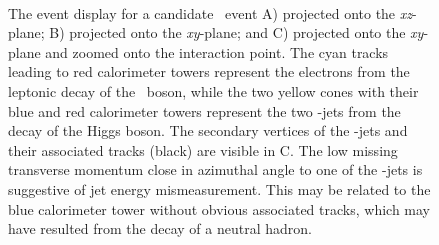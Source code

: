 \begin{figure}[htbp]
  \centering
  \mbox{
  }
  \mbox{
  }
  \caption[Event Display for \ZeeHbb\ Candidate]{The event display for a candidate \ZeeHbb\ event A) projected onto the \textit{xz}-plane; B) projected onto the \textit{xy}-plane; and C) projected onto the \textit{xy}-plane and zoomed onto the interaction point. The cyan tracks leading to red calorimeter towers represent the electrons from the leptonic decay of the \bosZ\ boson, while the two yellow cones with their blue and red calorimeter towers represent the two \qrkb-jets from the decay of the Higgs boson. The secondary vertices of the \qrkb-jets and their associated tracks (black) are visible in C. The low missing transverse momentum close in azimuthal angle to one of the \qrkb-jets is suggestive of jet energy mismeasurement. This may be related to the blue calorimeter tower without obvious associated tracks, which may have resulted from the decay of a neutral hadron.}
  \label{fig:evt_disp_Zee}
\end{figure}

